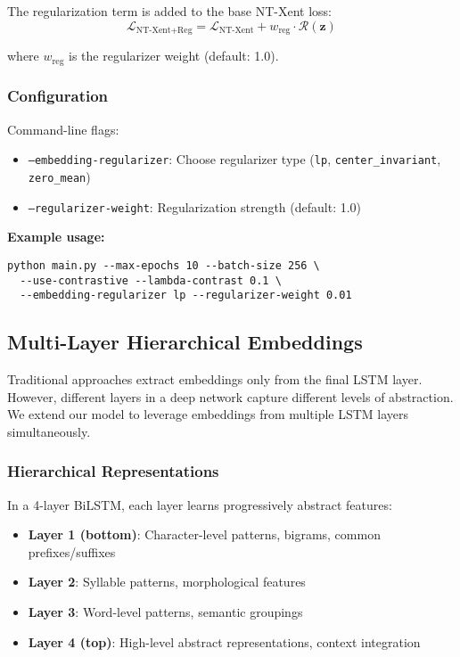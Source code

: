 \documentclass[12pt,a4paper]{article}
\begin{document}
The regularization term is added to the base NT-Xent loss:
\begin{equation}
\mathcal{L}_{\text{NT-Xent+Reg}} = \mathcal{L}_{\text{NT-Xent}} + w_{\text{reg}} \cdot \mathcal{R}(\mathbf{z})
\end{equation}

where $w_{\text{reg}}$ is the regularizer weight (default: 1.0).

\subsubsection{Configuration}

Command-line flags:
\begin{itemize}
    \item \texttt{--embedding-regularizer}: Choose regularizer type (\texttt{lp}, \texttt{center\_invariant}, \texttt{zero\_mean})
    \item \texttt{--regularizer-weight}: Regularization strength (default: 1.0)
\end{itemize}

\textbf{Example usage:}
\begin{verbatim}
python main.py --max-epochs 10 --batch-size 256 \
  --use-contrastive --lambda-contrast 0.1 \
  --embedding-regularizer lp --regularizer-weight 0.01
\end{verbatim}

\subsection{Multi-Layer Hierarchical Embeddings}

Traditional approaches extract embeddings only from the final LSTM layer. However, different layers in a deep network capture different levels of abstraction. We extend our model to leverage embeddings from multiple LSTM layers simultaneously.

\subsubsection{Hierarchical Representations}

In a 4-layer BiLSTM, each layer learns progressively abstract features:
\begin{itemize}
    \item \textbf{Layer 1 (bottom)}: Character-level patterns, bigrams, common prefixes/suffixes
    \item \textbf{Layer 2}: Syllable patterns, morphological features
    \item \textbf{Layer 3}: Word-level patterns, semantic groupings
    \item \textbf{Layer 4 (top)}: High-level abstract representations, context integration
\end{itemize}
\end{document}
